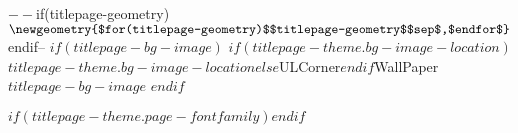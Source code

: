 \newcommand{\dateblock}{$if(date)$
$if(titlepage-theme.date-color)$\textcolor{$titlepage-theme.date-color$}$endif${$if(titlepage-theme.date-align)$\titlepagedatealign
$endif$$if(titlepage-theme.date-fontfamily)$\titlepagedatefont
$endif$\titlepagedateblock}

\vspace{$if(titlepage-theme.date-space-after)$$titlepage-theme.date-space-after$$else$0pt$endif$}
$else$$endif$}

\newcommand{\headerblock}{$if(titlepage-header)$
$if(titlepage-theme.header-color)$\textcolor{$titlepage-theme.header-color$}$endif${$if(titlepage-theme.header-align)$\titlepageheaderalign
$endif$$if(titlepage-theme.header-fontfamily)$\titlepageheaderfont$endif$\titlepageheaderblock

\vspace{$if(titlepage-theme.header-space-after)$$titlepage-theme.header-space-after$$else$0pt$endif$}
}$else$$endif$}
$--
$if(titlepage-geometry)$
\newgeometry{$for(titlepage-geometry)$$titlepage-geometry$$sep$,$endfor$}
$endif$
$--
$if(titlepage-bg-image)$
\newlength{\bgimagesize}
\setlength{\bgimagesize}{$if(titlepage-theme.bg-image-size)$$titlepage-theme.bg-image-size$$else$\paperwidth$endif$}
\LENGTHDIVIDE{\bgimagesize}{\paperwidth}{\theRatio} %
\This$if(titlepage-theme.bg-image-location)$$titlepage-theme.bg-image-location$$else$ULCorner$endif$WallPaper{\theRatio}{$titlepage-bg-image$}
$endif$

\thispagestyle{empty} %
$if(titlepage-theme.page-fontfamily)$\titlepagefont$endif$

